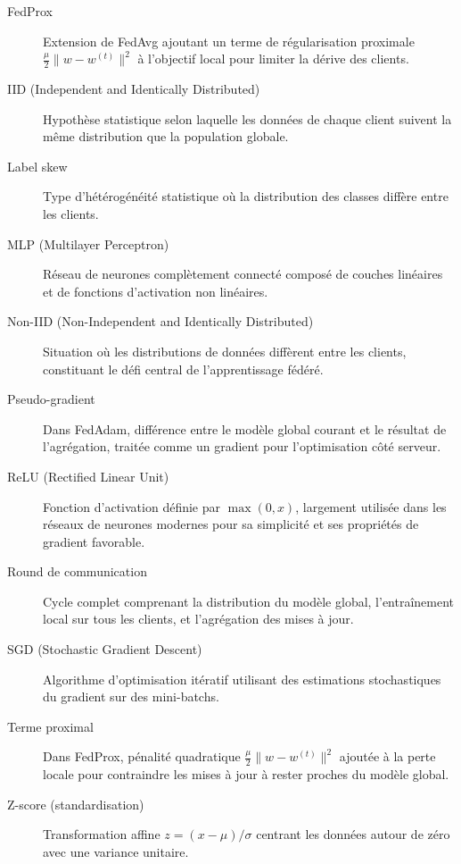 \documentclass[12pt,a4paper]{report}
\begin{document}
\begin{description}
\item[FedProx] Extension de FedAvg ajoutant un terme de r\'{e}gularisation proximale $\frac{\mu}{2}\|w - w^{(t)}\|^2$ \`{a} l'objectif local pour limiter la d\'{e}rive des clients.

\item[IID (Independent and Identically Distributed)] Hypoth\`{e}se statistique selon laquelle les donn\'{e}es de chaque client suivent la m\^{e}me distribution que la population globale.

\item[Label skew] Type d'h\'{e}t\'{e}rog\'{e}n\'{e}it\'{e} statistique o\`{u} la distribution des classes diff\`{e}re entre les clients.

\item[MLP (Multilayer Perceptron)] R\'{e}seau de neurones compl\`{e}tement connect\'{e} compos\'{e} de couches lin\'{e}aires et de fonctions d'activation non lin\'{e}aires.

\item[Non-IID (Non-Independent and Identically Distributed)] Situation o\`{u} les distributions de donn\'{e}es diff\`{e}rent entre les clients, constituant le d\'{e}fi central de l'apprentissage f\'{e}d\'{e}r\'{e}.

\item[Pseudo-gradient] Dans FedAdam, diff\'{e}rence entre le mod\`{e}le global courant et le r\'{e}sultat de l'agr\'{e}gation, trait\'{e}e comme un gradient pour l'optimisation c\^{o}t\'{e} serveur.

\item[ReLU (Rectified Linear Unit)] Fonction d'activation d\'{e}finie par $\max(0, x)$, largement utilis\'{e}e dans les r\'{e}seaux de neurones modernes pour sa simplicit\'{e} et ses propri\'{e}t\'{e}s de gradient favorable.

\item[Round de communication] Cycle complet comprenant la distribution du mod\`{e}le global, l'entra\^{i}nement local sur tous les clients, et l'agr\'{e}gation des mises \`{a} jour.

\item[SGD (Stochastic Gradient Descent)] Algorithme d'optimisation it\'{e}ratif utilisant des estimations stochastiques du gradient sur des mini-batchs.

\item[Terme proximal] Dans FedProx, p\'{e}nalit\'{e} quadratique $\frac{\mu}{2}\|w - w^{(t)}\|^2$ ajout\'{e}e \`{a} la perte locale pour contraindre les mises \`{a} jour \`{a} rester proches du mod\`{e}le global.

\item[Z-score (standardisation)] Transformation affine $z = (x - \mu) / \sigma$ centrant les donn\'{e}es autour de z\'{e}ro avec une variance unitaire.
\end{description}
\end{document}
